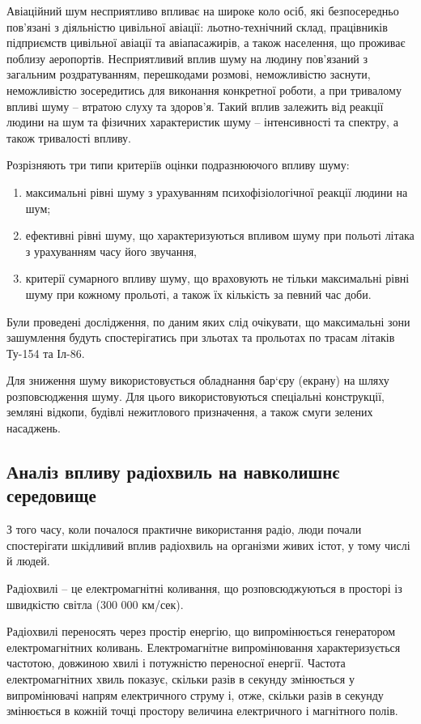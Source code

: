 Авіаційний шум несприятливо впливає на широке коло осіб, які безпосередньо пов’язані з діяльністю 
цивільної авіації: льотно-технічний склад, працівників підприємств цивільної авіації та авіапасажирів, 
а також населення, що проживає поблизу аеропортів. Несприятливий вплив шуму на людину пов’язаний з 
загальним роздратуванням, перешкодами розмові, неможливістю заснути, неможливістю зосередитись для 
виконання конкретної роботи, а при тривалому впливі шуму – втратою слуху та здоров’я. Такий вплив 
залежить від реакції людини на шум та фізичних характеристик шуму – інтенсивності та спектру, а 
також тривалості впливу.

Розрізняють три типи критеріїв оцінки подразнюючого впливу шуму:
\begin{enumerate}
 \item максимальні рівні шуму з урахуванням психофізіологічної реакції людини на шум;
 \item ефективні рівні шуму, що характеризуються впливом шуму при польоті літака з урахуванням часу його звучання, 
 \item критерії сумарного впливу шуму, що враховують не тільки максимальні рівні шуму при кожному 
прольоті, а також їх кількість за певний час доби.
\end{enumerate}

Були проведені дослідження, по даним яких слід очікувати, що максимальні зони зашумлення будуть 
спостерігатись при зльотах та прольотах по трасам літаків Ту-154 та Іл-86. 

Для зниження шуму використовується обладнання бар`єру (екрану) на шляху розповсюдження шуму. 
Для цього використовуються спеціальні конструкції, земляні відкопи, будівлі нежитлового призначення, а також смуги зелених насаджень.

\subsection{Аналіз впливу радіохвиль на навколишнє середовище}

З того часу, коли почалося практичне використання радіо, люди почали спостерігати шкідливий вплив 
радіохвиль на організми живих істот, у тому числі й людей.

Радіохвилі -- це електромагнітні коливання, що розповсюджуються в просторі із швидкістю світла (300 000 км/сек).

Радіохвилі переносять через простір енергію, що випромінюється генератором електромагнітних коливань. 
Електромагнітне випромінювання характеризується частотою, довжиною хвилі і потужністю переносної енергії. 
Частота електромагнітних хвиль показує, скільки разів в секунду змінюється у випромінювачі напрям електричного 
струму і, отже, скільки разів в секунду змінюється в кожній точці простору величина електричного і магнітного полів.

